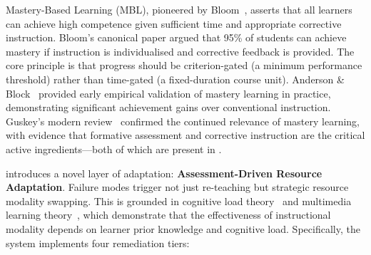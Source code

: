 Mastery-Based Learning (MBL), pioneered by Bloom~\cite{bloom1968}, asserts that all learners can achieve high competence given sufficient time and appropriate corrective instruction. Bloom's canonical paper argued that 95\% of students can achieve mastery if instruction is individualised and corrective feedback is provided. The core principle is that progress should be criterion-gated (a minimum performance threshold) rather than time-gated (a fixed-duration course unit). Anderson \& Block~\cite{anderson1975} provided early empirical validation of mastery learning in practice, demonstrating significant achievement gains over conventional instruction. Guskey's modern review~\cite{guskey2007} confirmed the continued relevance of mastery learning, with evidence that formative assessment and corrective instruction are the critical active ingredients---both of which are present in \projectname.

\projectname{} introduces a novel layer of adaptation: \textbf{Assessment-Driven Resource Adaptation}. Failure modes trigger not just re-teaching but strategic resource modality swapping. This is grounded in cognitive load theory~\cite{sweller1988} and multimedia learning theory~\cite{clark2016, mayer2009}, which demonstrate that the effectiveness of instructional modality depends on learner prior knowledge and cognitive load. Specifically, the system implements four remediation tiers:

